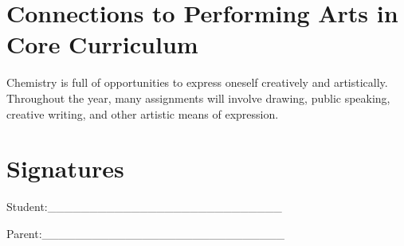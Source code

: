 \documentclass[11pt]{article}
\begin{document}
\section{Connections to Performing Arts in Core Curriculum}
\label{sec:org335b1db}
Chemistry is full of opportunities to express oneself creatively and artistically. Throughout the year, many assignments will involve drawing, public speaking, creative writing, and other artistic means of expression.

\section{Signatures}
\label{sec:orgd275869}

Student:\_\_\_\_\_\_\_\_\_\_\_\_\_\_\_\_\_\_\_\_\_\_\_\_\_\_\_\_


Parent:\_\_\_\_\_\_\_\_\_\_\_\_\_\_\_\_\_\_\_\_\_\_\_\_\_\_\_\_\_
\end{document}
